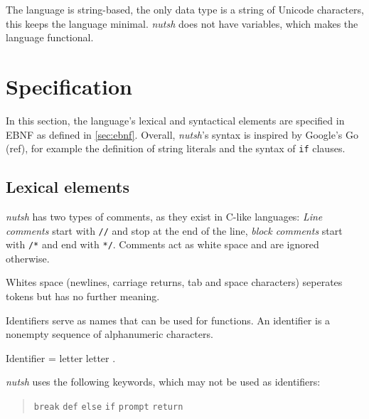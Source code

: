 \documentclass[paper=a4,twoside,abstract=on,cleardoublepage=empty,numbers=noenddot,toc=bib,12pt]{scrreprt}
\begin{document}
The language is string-based, the only data type is a string of Unicode characters, this keeps the language minimal. \emph{nutsh} does not have variables, which makes the language functional.

\section{Specification}

In this section, the language's lexical and syntactical elements are specified in \textsc{EBNF} as defined in \cref{sec:ebnf}. Overall, \emph{nutsh}'s syntax is inspired by Google's Go (ref), for example the definition of string literals and the syntax of \texttt{if} clauses.

\subsection{Lexical elements}


\emph{nutsh} has two types of comments, as they exist in C-like languages: \emph{Line comments} start with \texttt{//} and stop at the end of the line, \emph{block comments} start with \texttt{/*} and end with \texttt{*/}. Comments act as white space and are ignored otherwise.


Whites space (newlines, carriage returns, tab and space characters) seperates tokens but has no further meaning.


Identifiers serve as names that can be used for functions. An identifier is a nonempty sequence of alphanumeric characters.

\begin{ebnf}
Identifier = letter { letter } .
\end{ebnf}


\emph{nutsh} uses the following keywords, which may not be used as identifiers:

\begin{quote}
    \texttt{break}\hspace{0.5em}
    \texttt{def}\hspace{0.5em}
    \texttt{else}\hspace{0.5em}
    \texttt{if}\hspace{0.5em}
    \texttt{prompt}\hspace{0.5em}
    \texttt{return}
\end{quote}
\end{document}
